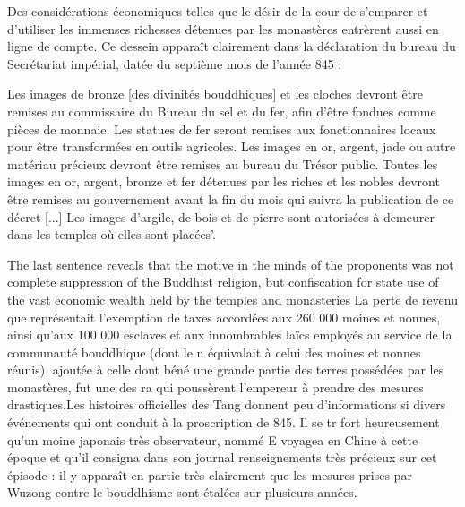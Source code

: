 Des considérations économiques telles que le désir de la cour de s'emparer et d'utiliser les immenses richesses détenues par les monastères entrèrent aussi en ligne de compte. Ce dessein apparaît clairement dans la déclaration du bureau du Secrétariat impérial, datée du septième mois de l'année 845 :
\begin{singlequote}
    Les images de bronze [des divinités bouddhiques] et les cloches devront être remises au commissaire du Bureau du sel et du fer, afin d'être fondues comme pièces de monnaie. Les statues de fer seront remises aux fonctionnaires locaux pour être transformées en outils agricoles. Les images en or, argent, jade ou autre matériau précieux devront être remises au bureau du Trésor public. Toutes les images en or, argent, bronze et fer détenues par les riches et les nobles devront être remises au gouvernement avant la fin du mois qui suivra la publication de ce décret [...] Les images d'argile, de bois et de pierre sont autorisées à demeurer dans les temples où elles sont placées'.
\end{singlequote}
The last sentence reveals that the motive in the minds of the
proponents was not complete suppression of the Buddhist religion,
but confiscation for state use of the vast economic wealth held by
the temples and monasteries
La perte de revenu que représentait l'exemption de taxes accordées aux 260 000 moines et nonnes, ainsi qu'aux 100 000 esclaves et aux innombrables laïcs employés au service de la communauté bouddhique (dont le n équivalait à celui des moines et nonnes réunis), ajoutée à celle dont béné une grande partie des terres possédées par les monastères, fut une des ra qui poussèrent l'empereur à prendre des mesures drastiques.Les histoires officielles des Tang donnent peu d'informations si divers événements qui ont conduit à la proscription de 845. Il se tr fort heureusement qu'un moine japonais très observateur, nommé E voyagea en Chine à cette époque et qu'il consigna dans son journal renseignements très précieux sur cet épisode : il y apparaît en partic très clairement que les mesures prises par Wuzong contre le bouddhisme sont étalées sur plusieurs années.
